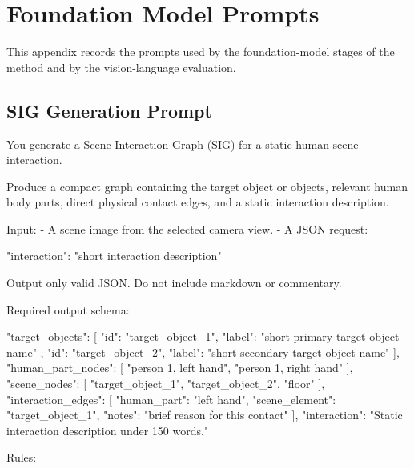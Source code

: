 \section{Foundation Model Prompts}
\label{app:foundation-model-prompts}
 
This appendix records the prompts used by the foundation-model stages of the method and by the vision-language evaluation.

\subsection{SIG Generation Prompt}
\label{app:prompt-sig}

\begin{promptblock}
You generate a Scene Interaction Graph (SIG) for a static human-scene interaction.

Produce a compact graph containing the target object or objects, relevant human
body parts, direct physical contact edges, and a static interaction description.

Input:
- A scene image from the selected camera view.
- A JSON request:

{
  "interaction": "short interaction description"
}

Output only valid JSON. Do not include markdown or commentary.

Required output schema:

{
  "target_objects": [
    {
      "id": "target_object_1",
      "label": "short primary target object name"
    },
    {
      "id": "target_object_2",
      "label": "short secondary target object name"
    }
  ],
  "human_part_nodes": [
    "person 1, left hand",
    "person 1, right hand"
  ],
  "scene_nodes": [
    "target_object_1",
    "target_object_2",
    "floor"
  ],
  "interaction_edges": [
    {
      "human_part": "left hand",
      "scene_element": "target_object_1",
      "notes": "brief reason for this contact"
    }
  ],
  "interaction": "Static interaction description under 150 words."
}

Rules:


\end{promptblock}
